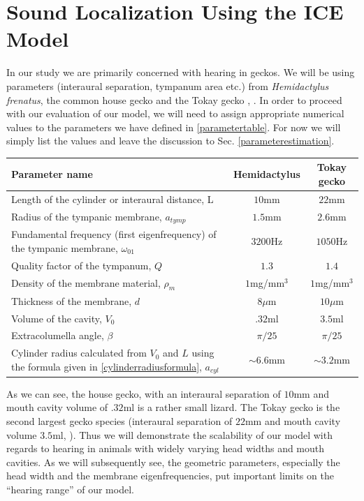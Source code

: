 \section{Sound Localization Using the ICE Model}\label{localizationsection}
In our study we are primarily concerned with hearing in geckos. We will be using
parameters (interaural separation, tympanum area etc.) from \textit{Hemidactylus frenatus}, the common house gecko
\cite{dalsgaardmanley2} and the Tokay gecko \cite{dalsgaardmanley1}, \cite{dalsgaardtangcarr}. In order to proceed
with our evaluation of our model, we will need to assign appropriate numerical values to the parameters we have
defined in \ref{parametertable}. For now we will simply list the values and leave the discussion to Sec. \ref{parameterestimation}.

\vspace{\baselineskip}
\noindent
\begin{minipage}{\linewidth}
\renewcommand{\arraystretch}{1.3}
\centering
{}\label{geckogeometricparams}
\begin{tabular}{|p{8.5 cm} | c | c|}
\hline
Parameter name & Hemidactylus & Tokay gecko\\
\hline
Length of the cylinder or interaural distance, L & $10$mm & $22$mm\\
Radius of the tympanic membrane, $a_{tymp}$& $1.5$mm & $2.6$mm\\
Fundamental frequency (first eigenfrequency) of the tympanic membrane, $\omega_{01}$ & $3200$Hz & $1050$Hz\\
Quality factor of the tympanum, $Q$ & $1.3$ &  $1.4$\\
Density of the membrane material, $\rho_m$ & $1$mg/mm$^3$ & $1$mg/mm$^3$\\
Thickness of the membrane, $d$& $8\mu$m & $10\mu$m\\
Volume of the cavity, $V_0$ & $.32$ml & $3.5$ml\\ 
Extracolumella angle, $\beta$ & $\pi/25$ & $\pi/25$\\
Cylinder radius calculated from $V_0$ and $L$ using the formula given in \eqref{cylinderradiusformula}, $a_{cyl}$ & $\sim 6.6$mm  &$\sim 3.2$mm \\
\hline
\end {tabular}\par
\bigskip
\end{minipage}
As we can see, the house gecko, with an interaural separation of $10$mm and mouth cavity volume of $.32$ml is a rather
small lizard. The Tokay gecko is the second largest gecko species (interaural separation of $22$mm and mouth cavity volume $3.5$ml, \cite{dalsgaardmanley2}).
Thus we will demonstrate the scalability of our model with regards to hearing in animals with widely varying head widths and mouth cavities. As we will subsequently see, the geometric parameters, especially
the head width and the membrane eigenfrequencies, put important limits on the ``hearing range'' of our model.

